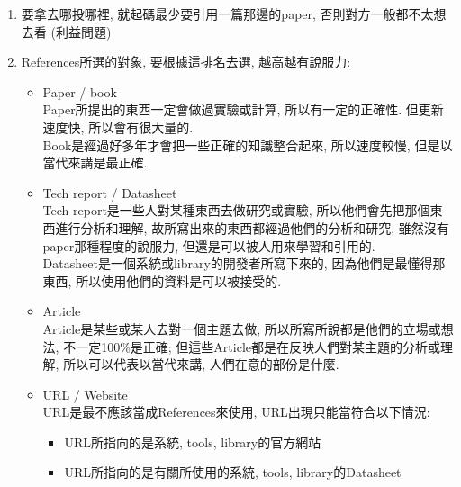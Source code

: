 \begin{enumerate}
  \item
  {
    要拿去哪投哪裡, 就起碼最少要引用一篇那邊的paper, 否則對方一般都不太想去看 (利益問題)
  } %

  \item
  {
    References所選的對象, 要根據這排名去選, 越高越有說服力:
    \begin{itemize}
      \item
      {
        Paper / book\\
        Paper所提出的東西一定會做過實驗或計算, 所以有一定的正確性. 但更新速度快, 所以會有很大量的.\\
        Book是經過好多年才會把一些正確的知識整合起來, 所以速度較慢, 但是以當代來講是最正確.
      } %

      \item
      {
        Tech report / Datasheet\\
        Tech report是一些人對某種東西去做研究或實驗, 所以他們會先把那個東西進行分析和理解, 故所寫出來的東西都經過他們的分析和研究, 雖然沒有paper那種程度的說服力, 但還是可以被人用來學習和引用的.\\
        Datasheet是一個系統或library的開發者所寫下來的, 因為他們是最懂得那東西, 所以使用他們的資料是可以被接受的.
      } %

      \item
      {
        Article\\
        Article是某些或某人去對一個主題去做, 所以所寫所說都是他們的立場或想法, 不一定100\%是正確; 但這些Article都是在反映人們對某主題的分析或理解, 所以可以代表以當代來講, 人們在意的部份是什麼.
      } %

      \item
      {
        URL / Website\\
        URL是最不應該當成References來使用, URL出現只能當符合以下情況:
        \begin{itemize}
          \item
          {
            URL所指向的是系統, tools, library的官方網站
          } %

          \item
          {
            URL所指向的是有關所使用的系統, tools, library的Datasheet
          } %


\end{itemize}}
\end{itemize}}
\end{enumerate}
